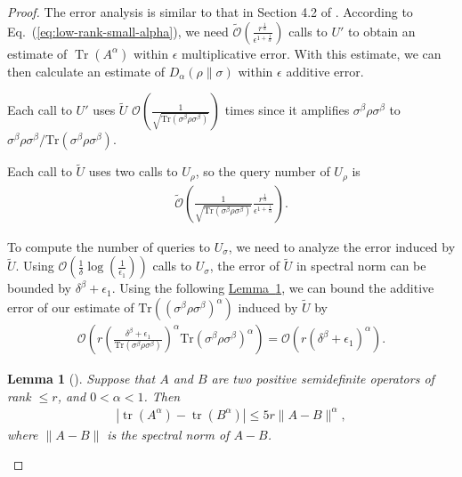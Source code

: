 \documentclass[journal]{IEEEtran}
\newtheorem{lemma}{Lemma}
\newcommand{\eq}[1]{Eq.~(\ref{eq:#1})}
\newcommand{\lem}[1]{\hyperref[lem:#1]{Lemma~\ref*{lem:#1}}}
\begin{document}
\begin{proof}
  The error analysis is similar to that in Section 4.2 of \cite{wang2022new}. 
  According to \eq{low-rank-small-alpha}, we need $\widetilde{\mathcal{O}}\left(\frac{r^{\frac{1}{\alpha}}}{\epsilon^{1+\frac{1}{\alpha}}}\right)$ calls to $U'$ to obtain an estimate of $\operatorname{Tr}(A^{\alpha})$ within $\epsilon$ multiplicative error. With this estimate, we can then calculate an estimate of $D_\alpha(\rho \| \sigma)$ within $\epsilon$ additive error. 
  
  Each call to $U'$ uses $\tilde{U}$ $\mathcal{\mathcal{O}}
  \left(\frac{1}{\sqrt{\mathrm{Tr}(\sigma^{\beta}\rho\sigma^{\beta})}}\right)$ times since it amplifies $\sigma^{\beta}\rho\sigma^{\beta}$ to $\sigma^{\beta}\rho\sigma^{\beta}/\mathrm{Tr}(\sigma^{\beta}\rho\sigma^{\beta})$. 
  
  Each call to $\tilde{U}$ uses two calls to $U_{\rho}$, so the query number of $U_{\rho}$ is 
  \begin{align}
      \widetilde{\mathcal{O}}\left(\frac{1}{\sqrt{\mathrm{Tr}(\sigma^{\beta}\rho\sigma^{\beta})}}\frac{r^{\frac{1}{\alpha}}}{\epsilon^{1+\frac{1}{\alpha}}}\right).
  \end{align}
  
  
  To compute the number of queries to $U_\sigma$, we need to analyze the error induced by $\tilde{U}$. Using $\mathcal{O}\left(\frac{1}{\delta}\log(\frac{1}{\epsilon_1})\right)$ calls to $U_{\sigma}$, the error of $\tilde{U}$ in spectral norm can be bounded by $\delta^{\beta}+\epsilon_1$. Using the following \lem{power-trace-diff}, we can bound the additive error of our estimate of $\mathrm{Tr}((\sigma^{\beta}\rho\sigma^{\beta})^{\alpha})$ induced by $\tilde{U}$ by 
  \begin{align}
      \mathcal{O}\left(r\left(\frac{\delta^\beta+\epsilon_1}{\mathrm{Tr}(\sigma^{\beta}\rho\sigma^{\beta})}\right)^{\alpha}\mathrm{Tr}(\sigma^{\beta}\rho\sigma^{\beta})^{\alpha}\right) = \mathcal{O}\left(r(\delta^{\beta}+\epsilon_1)^{\alpha}\right).
  \end{align}
  \begin{lemma}[{\cite[Lemma 4.6]{wang2022new}}]
    \label{lem:power-trace-diff}
    Suppose that $A$ and $B$ are two positive semidefinite operators of rank $\leq r$, and $0<\alpha<1$. Then
  \begin{align}
  \left|\operatorname{tr}\left(A^\alpha\right)-\operatorname{tr}\left(B^\alpha\right)\right| \leq 5 r\|A-B\|^\alpha,
  \end{align}
  where $\|A-B\|$ is the spectral norm of $A-B$. 
  \end{lemma}
  

\end{proof}
\end{document}
